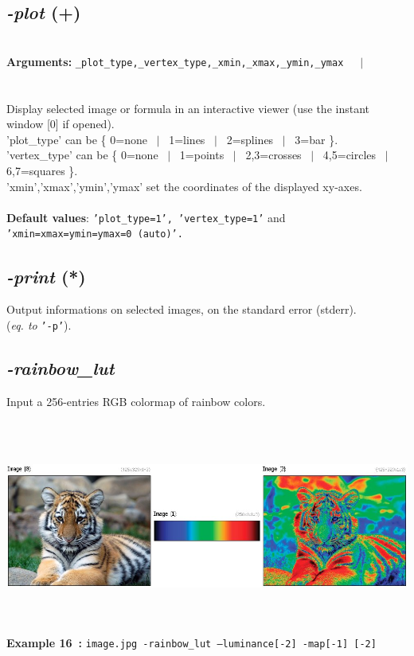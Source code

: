 \documentclass[a4paper,11pt,twoside]{book}
\begin{document}
\subsection{\emph{-plot} (+)}\vspace*{-0.5em}
~\\\textbf{Arguments: } 
{\small \texttt{\_plot\_type,\_vertex\_type,\_xmin,\_xmax,\_ymin,\_ymax}}~~~$|$\\
\\~\\
Display selected image or formula in an interactive viewer (use the instant window [0] if opened).
~\\'plot\_type' can be \{ 0=none ~$|$~ 1=lines ~$|$~ 2=splines ~$|$~ 3=bar \}.
~\\'vertex\_type' can be \{ 0=none ~$|$~ 1=points ~$|$~ 2,3=crosses ~$|$~ 4,5=circles ~$|$~ 6,7=squares \}.
~\\'xmin','xmax','ymin','ymax' set the coordinates of the displayed xy-axes.
~\\~\\\textbf{Default values}: {\small \texttt{'plot\_type=1', 'vertex\_type=1'} and \texttt{'xmin=xmax=ymin=ymax=0 (auto)'.}}


\subsection{\emph{-print} (*)}\vspace*{-0.5em}
Output informations on selected images, on the standard error (stderr).
~\\(\emph{eq. to} {\small \texttt{'-p'}}).


\subsection{\emph{-rainbow\_lut} }\vspace*{-0.5em}
Input a 256-entries RGB colormap of rainbow colors.
\begin{center}\includegraphics[keepaspectratio=true,height=7cm,width=\textwidth]{img/gmic_def16.jpg}\\
{\footnotesize \textbf{Example 16~:} \texttt{image.jpg -rainbow\_lut --luminance[-2] -map[-1] [-2]}}
\end{center}
\end{document}
